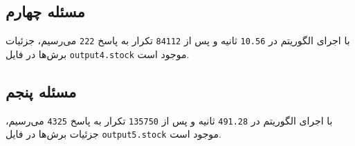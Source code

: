 \documentclass[a4paper, 12pt]{article}
\begin{document}
\subsection{مسئله چهارم}
با اجرای الگوریتم در
\texttt{10.56}
ثانیه و پس از
\texttt{84112}
تکرار به پاسخ
\texttt{222}
می‌رسیم، جزئیات برش‌ها در فایل
\texttt{output4.stock}
موجود است.

\subsection{مسئله پنجم}
با اجرای الگوریتم در
\texttt{491.28}
ثانیه و پس از
\texttt{135750}
تکرار به پاسخ
\texttt{4325}
می‌رسیم، جزئیات برش‌ها در فایل
\texttt{output5.stock}
موجود است.
\end{document}
